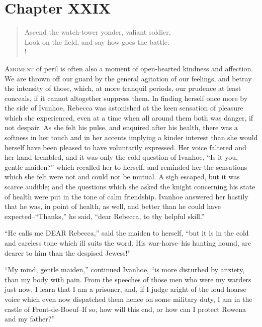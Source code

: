 \chapter{Chapter XXIX}

\begin{verse}
Ascend the watch-tower yonder, valiant soldier,\\
Look on the field, and say how goes the battle.\\!
\end{verse}

\lettrine{A}{moment} of peril is often also a moment of open-hearted
kindness and
affection. We are thrown off our guard by the general agitation of our
feelings, and betray the intensity of those, which, at more tranquil
periods, our prudence at least conceals, if it cannot altogether
suppress them. In finding herself once more by the side of Ivanhoe,
Rebecca was astonished at the keen sensation of pleasure which she
experienced, even at a time when all around them both was danger, if not
despair. As she felt his pulse, and enquired after his health, there was
a softness in her touch and in her accents implying a kinder interest
than she would herself have been pleased to have voluntarily expressed.
Her voice faltered and her hand trembled, and it was only the cold
question of Ivanhoe, ``Is it you, gentle maiden?'' which recalled her to
herself, and reminded her the sensations which she felt were not and
could not be mutual. A sigh escaped, but it was scarce audible; and the
questions which she asked the knight concerning his state of health were
put in the tone of calm friendship. Ivanhoe answered her hastily that he
was, in point of health, as well, and better than he could have
expected--``Thanks,'' he said, ``dear Rebecca, to thy helpful skill.''

``He calls me DEAR Rebecca,'' said the maiden to herself, ``but it is in
the cold and careless tone which ill suits the word. His war-horse--his
hunting hound, are dearer to him than the despised Jewess!''

``My mind, gentle maiden,'' continued Ivanhoe, ``is more disturbed by
anxiety, than my body with pain. From the speeches of those men who were
my warders just now, I learn that I am a prisoner, and, if I judge
aright of the loud hoarse voice which even now dispatched them hence on
some military duty, I am in the castle of Front-de-Boeuf--If so, how
will this end, or how can I protect Rowena and my father?''

